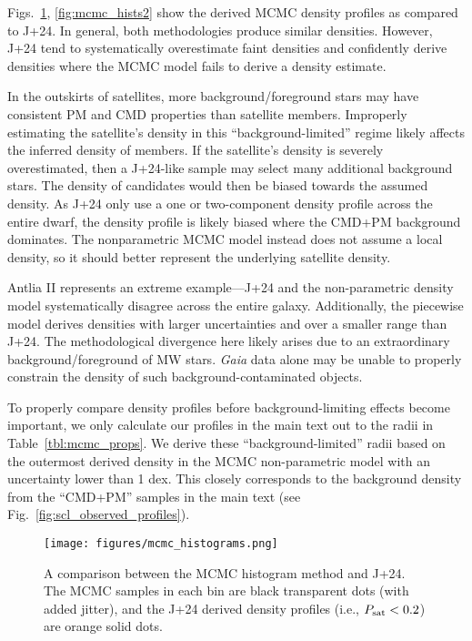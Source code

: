 Figs.~\ref{fig:mcmc_hists}, \ref{fig:mcmc_hists2} show the derived MCMC
density profiles as compared to J+24. In general, both methodologies
produce similar densities. However, J+24 tend to systematically
overestimate faint densities and confidently derive densities where the
MCMC model fails to derive a density estimate.

In the outskirts of satellites, more background/foreground stars may
have consistent PM and CMD properties than satellite members. Improperly
estimating the satellite's density in this ``background-limited'' regime
likely affects the inferred density of members. If the satellite's
density is severely overestimated, then a J+24-like sample may select
many additional background stars. The density of candidates would then
be biased towards the assumed density. As J+24 only use a one or
two-component density profile across the entire dwarf, the density
profile is likely biased where the CMD+PM background dominates. The
nonparametric MCMC model instead does not assume a local density, so it
should better represent the underlying satellite density.

Antlia II represents an extreme example---J+24 and the non-parametric
density model systematically disagree across the entire galaxy.
Additionally, the piecewise model derives densities with larger
uncertainties and over a smaller range than J+24. The methodological
divergence here likely arises due to an extraordinary
background/foreground of MW stars. \emph{Gaia} data alone may be unable
to properly constrain the density of such background-contaminated
objects.

To properly compare density profiles before background-limiting effects
become important, we only calculate our profiles in the main text out to
the radii in Table~\ref{tbl:mcmc_props}. We derive these
``background-limited'' radii based on the outermost derived density in
the MCMC non-parametric model with an uncertainty lower than 1 dex. This
closely corresponds to the background density from the ``CMD+PM''
samples in the main text (see Fig.~\ref{fig:scl_observed_profiles}).

\begin{figure}
\centering
\texttt{[image: figures/mcmc\_histograms.png]}
\caption[Probabilistic density profiles]{A comparison between the MCMC
histogram method and J+24. The MCMC samples in each bin are black
transparent dots (with added jitter), and the J+24 derived density
profiles (i.e., \(P_{\rm sat} < 0.2\)) are orange solid
dots.}\label{fig:mcmc_hists}
\end{figure}

